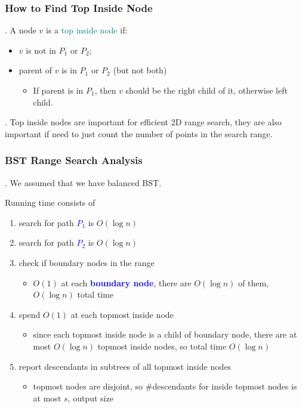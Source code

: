 \documentclass{article}
\begin{document}
\subsubsection{How to Find Top Inside Node} 

\begin{thmm}[].
    A node $v$ is a \textcolor{teal}{top inside node} if: \begin{itemize}
        \item $v$ is not in $P_1$ or $P_2$; 
        \item parent of $v$ is in $P_1$ or $P_2$ (but not both) 
        \begin{itemize}
            \item If parent is in $P_1$, then $v$ should be the right child of it, otherwise left child. 
        \end{itemize} 
    \end{itemize}
\end{thmm}

\begin{comm}[].
    Top inside nodes are important for efficient 2D range search, they are also important if need to just count the number of points in the search range. 
\end{comm}

\subsubsection{BST Range Search Analysis} 

\begin{comm}[].
    We assumed that we have balanced BST. 
\end{comm}

Running time consists of
\begin{enumerate}
    \item search for path \textbf{\textcolor{blue}{$P_1$}} is $O(\log n)$
    \item search for path \textbf{\textcolor{blue}{$P_2$}} is $O(\log n)$
    \item check if boundary nodes in the range
    \begin{itemize}
        \item $O(1)$ at each \textbf{\textcolor{blue}{boundary node}}, there are $O(\log n)$ of them, $O(\log n)$ total time
    \end{itemize}
    \item spend $O(1)$ at each topmost inside node
    \begin{itemize}
        \item since each topmost inside node is a child of boundary node, there are at most $O(\log n)$ topmost inside nodes, so total time $O(\log n)$
    \end{itemize}
    \item report descendants in subtrees of all topmost inside nodes
    \begin{itemize}
        \item topmost nodes are disjoint, so \#descendants for inside topmost nodes is at most $s$, output size
    \end{itemize}
\end{enumerate}
\end{document}
